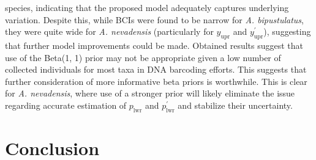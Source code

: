 \documentclass[12pt]{article}
\begin{document}
species, indicating that the proposed model adequately captures underlying variation. Despite this, while BCIs were found to be narrow for \textit{A. bipustulatus}, they were quite wide for \textit{A. nevadensis} (particularly for $y_{\mathrm{upr}}$ and $y^{'}_{\mathrm{upr}}$), suggesting that further model improvements could be made. Obtained results suggest that use of the Beta(1, 1) prior may not be appropriate given a low number of collected individuals for most taxa in DNA barcoding efforts. This suggests that further consideration of more informative beta priors is worthwhile. This is clear for \textit{A. nevadensis}, where use of a stronger prior will likely eliminate the issue regarding accurate estimation of $p_{\mathrm{lwr}}$ and $p^{'}_{\mathrm{lwr}}$ and stabilize their uncertainty.



\section{Conclusion}
\end{document}
